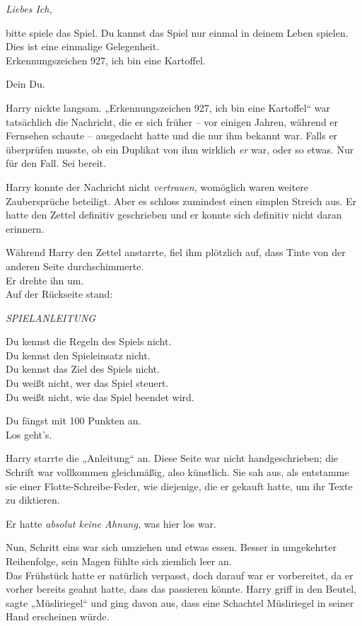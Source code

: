 {\emph{Liebes Ich,}

bitte spiele das Spiel. Du kannst das Spiel nur einmal in deinem Leben spielen. Dies ist eine einmalige Gelegenheit.\\ Erkennungszeichen 927, ich bin eine Kartoffel.

Dein Du.

Harry nickte langsam. „Erkennungszeichen 927, ich bin eine Kartoffel“ war tatsächlich die Nachricht, die er sich früher -- vor einigen Jahren, während er Fernsehen schaute -- ausgedacht hatte und die nur ihm bekannt war. Falls er überprüfen musste, ob ein Duplikat von ihm wirklich \emph{er} war, oder so etwas. Nur für den Fall. Sei bereit.

Harry konnte der Nachricht nicht \emph{vertrauen,} womöglich waren weitere Zaubersprüche beteiligt. Aber es schloss zumindest einen simplen Streich aus. Er hatte den Zettel definitiv geschrieben und er konnte sich definitiv nicht daran erinnern.

Während Harry den Zettel anstarrte, fiel ihm plötzlich auf, dass Tinte von der anderen Seite durchschimmerte.\\ Er drehte ihn um.\\ Auf der Rückseite stand:

\emph{SPIELANLEITUNG}

Du kennst die Regeln des Spiels nicht.\\ Du kennst den Spieleinsatz nicht.\\ Du kennst das Ziel des Spiels nicht.\\ Du weißt nicht, wer das Spiel steuert.\\ Du weißt nicht, wie das Spiel beendet wird.

Du fängst mit 100 Punkten an.\\ Los geht's.

Harry starrte die „Anleitung“ an. Diese Seite war nicht handgeschrieben; die Schrift war vollkommen gleichmäßig, also künstlich. Sie sah aus, als entstamme sie einer Flotte-Schreibe-Feder, wie diejenige, die er gekauft hatte, um ihr Texte zu diktieren.

Er hatte \emph{absolut keine Ahnung,} was hier los war.

Nun, Schritt eins war sich umziehen und etwas essen. Besser in umgekehrter Reihenfolge, sein Magen fühlte sich ziemlich leer an.\\ Das Frühstück hatte er natürlich verpasst, doch darauf war er vorbereitet, da er vorher bereits geahnt hatte, dass das passieren könnte. Harry griff in den Beutel, sagte „Müsliriegel“ und ging davon aus, dass eine Schachtel Müsliriegel in seiner Hand erscheinen würde.

}
